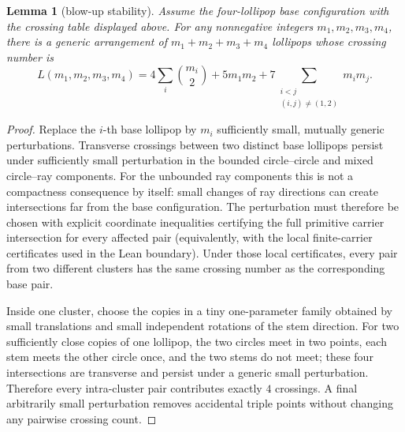 \documentclass[12pt]{article}
\theoremstyle{plain}
\newtheorem{lemma}[theorem]{Lemma}
\theoremstyle{definition}
\theoremstyle{remark}
\begin{document}
\begin{lemma}[blow-up stability]\label{lem:blowup}
Assume the four-lollipop base configuration with the crossing table displayed
above.
For any nonnegative integers \(m_1,m_2,m_3,m_4\), there is a generic
arrangement of \(m_1+m_2+m_3+m_4\) lollipops whose crossing number is
\begin{equation}\label{eq:lower-L}
  L(m_1,m_2,m_3,m_4)
  =4\sum_i\binom{m_i}{2}
   +5m_1m_2
   +7\sum_{\substack{i<j\\(i,j)\ne(1,2)}}m_i m_j.
\end{equation}
\end{lemma}

\begin{proof}
Replace the \(i\)-th base lollipop by \(m_i\) sufficiently small, mutually
generic perturbations.  Transverse crossings between two distinct base
lollipops persist under sufficiently small perturbation in the bounded
circle--circle and mixed circle--ray components.  For the unbounded ray
components this is not a compactness consequence by itself: small changes of
ray directions can create intersections far from the base configuration.  The
perturbation must therefore be chosen with explicit coordinate inequalities
certifying the full primitive carrier intersection for every affected pair
(equivalently, with the local finite-carrier certificates used in the Lean
boundary).  Under those local certificates, every pair from two different
clusters has the same crossing number as the corresponding base pair.

Inside one cluster, choose the copies in a tiny one-parameter family obtained
by small translations and small independent rotations of the stem direction.
For two sufficiently close copies of one lollipop, the two circles meet in two
points, each stem meets the other circle once, and the two stems do not meet;
these four intersections are transverse and persist under a generic small
perturbation.  Therefore every intra-cluster pair contributes exactly \(4\)
crossings.  A final arbitrarily small perturbation removes accidental triple
points without changing any pairwise crossing count.
\end{proof}
\end{document}
